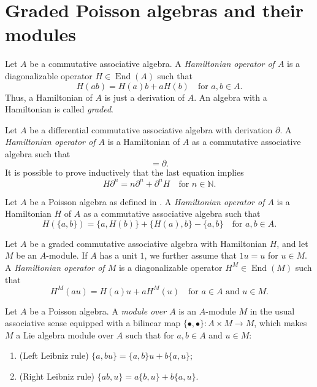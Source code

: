 \documentclass[a4paper, 12pt, reqno]{amsart}
\theoremstyle{remark}
\DeclareMathOperator{\End}{End}
\begin{document}
\appendix
\section{Graded Poisson algebras and their modules}
\label{sec:grad-poiss-algeb}

Let $A$ be a commutative associative algebra.
A \emph{Hamiltonian operator of $A$} is a diagonalizable operator $H \in \End(A)$ such that
\begin{equation*}
  H(ab) = H(a)b + aH(b) \quad \text{for $a, b \in A$}.
\end{equation*}
Thus, a Hamiltonian of $A$ is just a derivation of $A$.
An algebra with a Hamiltonian is called \emph{graded}.

Let $A$ be a differential commutative associative algebra with derivation $\partial$.
A \emph{Hamiltonian operator of $A$} is a Hamiltonian of $A$ as a commutative associative algebra such that
\begin{equation*}
  [H, \partial] = \partial.
\end{equation*}
It is possible to prove inductively that the last equation implies
\begin{equation}
  \label{eq:13}
  H\partial^n = n\partial^n + \partial^nH \quad \text{for $n \in \mathbb{N}$}.
\end{equation}

Let $A$ be a Poisson algebra as defined in \cite{caressa_examples_2003}.
A \emph{Hamiltonian operator of $A$} is a Hamiltonian $H$ of $A$ as a commutative associative algebra such that
\begin{equation*}
  H(\{a, b\}) = \{a, H(b)\} + \{H(a), b\} - \{a, b\} \quad \text{for $a, b \in A$}.
\end{equation*}

Let $A$ be a graded commutative associative algebra with Hamiltonian $H$, and let $M$ be an $A$-module.
If $A$ has a unit $1$, we further assume that $1u = u$ for $u \in M$.
A \emph{Hamiltonian operator of $M$} is a diagonalizable operator $H^M \in \End(M)$ such that
\begin{equation*}
  H^M(au) = H(a)u + aH^M(u) \quad \text{for $a \in A$ and $u \in M$}.
\end{equation*}

Let $A$ be a Poisson algebra.
A \emph{module over $A$} is an $A$-module $M$ in the usual associative sense equipped with a bilinear map $\{\bullet, \bullet\}: A \times M \to M$, which makes $M$ a Lie algebra module over $A$ such that for $a, b \in A$ and $u \in M$:
\begin{enumerate}
\item (Left Leibniz rule) $\{a, bu\} = \{a, b\}u + b\{a, u\}$;
\item (Right Leibniz rule) $\{ab, u\} = a\{b, u\} + b\{a, u\}$.
\end{enumerate}
\end{document}
